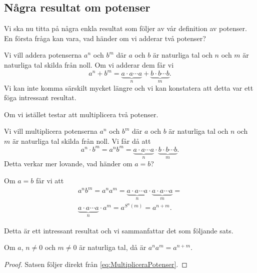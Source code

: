 \subsection{Några resultat om potenser}
Vi ska nu titta på några enkla resultat som följer av vår definition av
potenser.
En första fråga kan vara, vad händer om vi adderar två potenser?
\begin{example}\label{ex:AdderaPotenser}
  Vi vill addera potenserna \(a^n\) och \(b^m\) där \(a\) och \(b\) är
  naturliga tal och \(n\) och \(m\) är naturliga tal skilda från noll.
  Om vi adderar dem får vi
  \begin{equation*}
    a^n + b^m = \underbrace{a\cdot a\cdots a}_n + \underbrace{b\cdot
    b\cdots b}_m.
  \end{equation*}
  Vi kan inte komma särskilt mycket längre och vi kan konstatera att detta
  var ett föga intressant resultat.
\end{example}

Om vi istället testar att multiplicera två potenser.
\begin{example}\label{ex:MultipliceraPotenser}
  Vi vill multiplicera potenserna \(a^n\) och \(b^m\) där \(a\) och \(b\) är
  naturliga tal och \(n\) och \(m\) är naturliga tal skilda från noll.
  Vi får då att
  \begin{equation*}
    a^n\cdot b^m = a^n b^m = \underbrace{a\cdot a\cdots a}_n\cdot
    \underbrace{b\cdot b\cdots b}_m.
  \end{equation*}
  Detta verkar mer lovande, vad händer om \(a=b\)?

  Om \(a=b\) får vi att
  \begin{multline}
    \label{eq:MultipliceraPotenser}
    a^n b^m = a^n a^m = \underbrace{a\cdot a\cdots a}_n\cdot\underbrace{a\cdot
    a\cdots a}_m = \\
    \underbrace{a\cdot a\cdots a}_{n}\cdot a^m = a^{S^n(m)} = a^{n+m}.
  \end{multline}
\end{example}

Detta är ett intressant resultat och vi sammanfattar det som följande sats.
\begin{theorem}\label{thm:AdderaExponenter}
  Om \(a\), \(n\neq 0\) och \(m\neq 0\) är naturliga tal, då är \(a^n a^m =
  a^{n+m}\).
\end{theorem}
\begin{proof}
  Satsen följer direkt från \cref{eq:MultipliceraPotenser}.
\end{proof}

